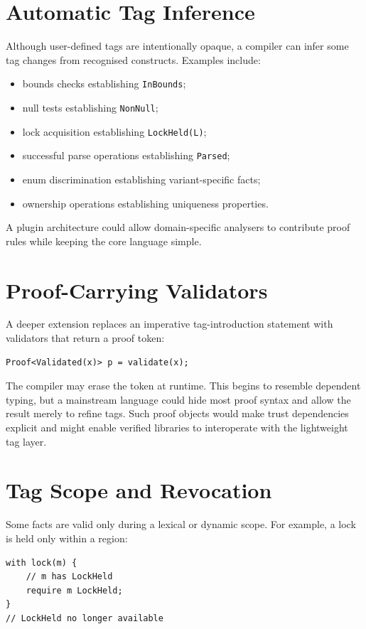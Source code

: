 \documentclass[11pt]{article}
\begin{document}
\section{Automatic Tag Inference}
Although user-defined tags are intentionally opaque, a compiler can infer some tag changes from recognised constructs. Examples include:
\begin{itemize}
  \item bounds checks establishing \texttt{InBounds};
  \item null tests establishing \texttt{NonNull};
  \item lock acquisition establishing \texttt{LockHeld(L)};
  \item successful parse operations establishing \texttt{Parsed};
  \item enum discrimination establishing variant-specific facts;
  \item ownership operations establishing uniqueness properties.
\end{itemize}

A plugin architecture could allow domain-specific analysers to contribute proof rules while keeping the core language simple.

\section{Proof-Carrying Validators}
A deeper extension replaces an imperative tag-introduction statement with validators that return a proof token:

\begin{lstlisting}
Proof<Validated(x)> p = validate(x);
\end{lstlisting}

The compiler may erase the token at runtime. This begins to resemble dependent typing, but a mainstream language could hide most proof syntax and allow the result merely to refine tags. Such proof objects would make trust dependencies explicit and might enable verified libraries to interoperate with the lightweight tag layer.

\section{Tag Scope and Revocation}
Some facts are valid only during a lexical or dynamic scope. For example, a lock is held only within a region:

\begin{lstlisting}
with lock(m) {
    // m has LockHeld
    require m LockHeld;
}
// LockHeld no longer available
\end{lstlisting}
\end{document}
